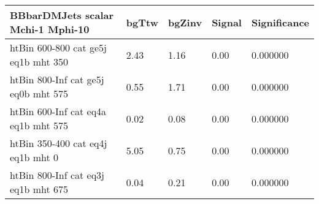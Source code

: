  \begin{tabular}{|l|l|l|l|l|}
\small
   \label{mostSensitiveBins_BBbarDMJets_scalar_Mchi-1_Mphi-10_25ns}
	\textbf{BBbarDMJets scalar Mchi-1 Mphi-10}	 & 	bgTtw	 & 	bgZinv	 & 	Signal &	 Significance \\ 
	\hline
	htBin 600-800 cat ge5j eq1b mht 350 & 	2.43	 & 	1.16	 & 	0.00 	&0.000000 \\ 
	htBin 800-Inf cat ge5j eq0b mht 575 & 	0.55	 & 	1.71	 & 	0.00 	&0.000000 \\ 
	htBin 600-Inf cat eq4a eq1b mht 575 & 	0.02	 & 	0.08	 & 	0.00 	&0.000000 \\ 
	htBin 350-400 cat eq4j eq1b mht 0 & 	5.05	 & 	0.75	 & 	0.00 	&0.000000 \\ 
	htBin 800-Inf cat eq3j eq1b mht 675 & 	0.04	 & 	0.21	 & 	0.00 	&0.000000 \\ 
\end{tabular}
